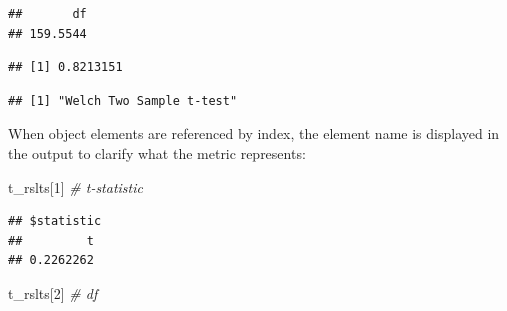 \documentclass[]{book}
\newenvironment{Shaded}{\begin{snugshade}}{\end{snugshade}}
\newcommand{\CommentTok}[1]{\textcolor[rgb]{0.56,0.35,0.01}{\textit{#1}}}
\newcommand{\DecValTok}[1]{\textcolor[rgb]{0.00,0.00,0.81}{#1}}
\newcommand{\NormalTok}[1]{#1}
\newcommand{\OperatorTok}[1]{\textcolor[rgb]{0.81,0.36,0.00}{\textbf{#1}}}
\begin{document}
\begin{Shaded}
\end{Shaded}

\begin{verbatim}
##       df 
## 159.5544
\end{verbatim}

\begin{Shaded}
\end{Shaded}

\begin{verbatim}
## [1] 0.8213151
\end{verbatim}

\begin{Shaded}
\end{Shaded}

\begin{verbatim}
## [1] "Welch Two Sample t-test"
\end{verbatim}

When object elements are referenced by index, the element name is displayed in the output to clarify what the metric represents:

\begin{Shaded}
\begin{Highlighting}[]
\NormalTok{t_rslts[}\DecValTok{1}\NormalTok{] }\CommentTok{# t-statistic}
\end{Highlighting}
\end{Shaded}

\begin{verbatim}
## $statistic
##         t 
## 0.2262262
\end{verbatim}

\begin{Shaded}
\begin{Highlighting}[]
\NormalTok{t_rslts[}\DecValTok{2}\NormalTok{] }\CommentTok{# df}
\end{Highlighting}
\end{Shaded}
\end{document}
